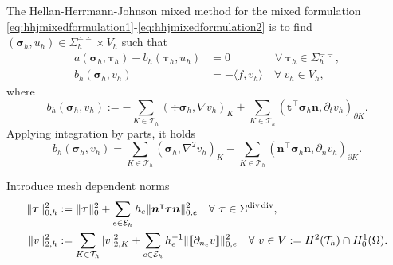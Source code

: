 The Hellan-Herrmann-Johnson mixed method for the mixed formulation \eqref{eq:hhjmixedformulation1}-\eqref{eq:hhjmixedformulation2} is to find
$(\boldsymbol{\sigma}_h, u_h)\in \Sigma_h^{\div\div}\times V_h$ such that
\begin{align}
a(\boldsymbol\sigma_h, \boldsymbol\tau_h)+ b_h(\boldsymbol\tau_h, u_h) & =0 \quad\quad\quad\quad \forall~\boldsymbol\tau_h\in\Sigma_h^{\div\div}, \label{eq:hhjmfem1}\\
b_h(\boldsymbol\sigma_h, v_h) & =-\langle f, v_h\rangle  \quad \forall~v_h\in V_h, \label{eq:hhjmfem2}
\end{align}
where
\[
b_h(\boldsymbol\sigma_h, v_h):=-\sum_{K\in\mathcal T_h}(\div\boldsymbol\sigma_h, \nabla v_h)_K+\sum_{K\in\mathcal T_h}(\boldsymbol{t}^{\intercal}\boldsymbol\sigma_h\boldsymbol{n}, \partial_t v_h)_{\partial K}.
\]
Applying integration by parts, it holds
\[
b_h(\boldsymbol\sigma_h, v_h)=\sum_{K\in\mathcal T_h}(\boldsymbol\sigma_h, \nabla^2v_h)_K-\sum_{K\in\mathcal T_h}(\boldsymbol{n}^{\intercal}\boldsymbol\sigma_h\boldsymbol{n}, \partial_{n} v_h)_{\partial K}.
\]

Introduce mesh dependent norms
\begin{align*}
\|\boldsymbol{\tau}\|_{0,h}^2&:=\|\boldsymbol{\tau}\|_0^2+\sum_{e\in\mathcal{E}_h}h_e\|\boldsymbol{n}^{\intercal}\boldsymbol\tau\boldsymbol{n}\|_{0,e}^2\quad\forall~\boldsymbol\tau\in\Sigma^{\operatorname{div}\operatorname{div}},\\
\|v\|_{2,h}^2&:=\sum_{K\in\mathcal{T}_h}|v|_{2,K}^2+\sum_{e\in\mathcal{E}_h}h_e^{-1}\|\llbracket\partial_{n_e}v\rrbracket\|_{0,e}^2\quad\forall~v\in V:=H^2(\mathcal T_h)\cap H_0^1(\Omega).
\end{align*}

